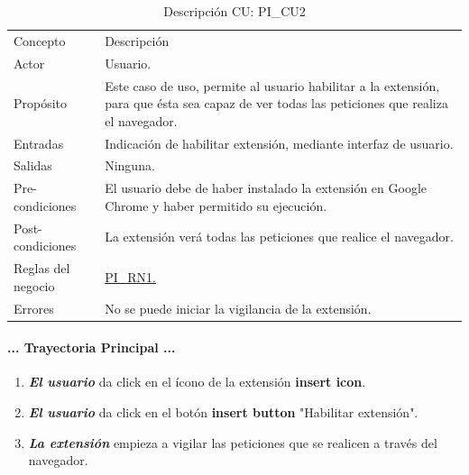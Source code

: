 \documentclass[12pt, a4paper, titlepage]{article}
\begin{document}
				\newpage
				\begin{table}[htb]
				\begin{center}
				\begin{tabular}{ |p{3.5cm}||p{9.5cm}|}
					\hline
					\rowcolor{guindapoli}
					\multicolumn{2}{|c|}{\textbf{\textcolor{white}{Caso de uso: PI\_CU2. Habilitar extensión.}}}\\
					\hline
					\rowcolor{azulfuerte}Concepto & Descripción\\
					\hline
					\cellcolor{azulclaro}Actor & 
					Usuario.\\ 
					\hline
					\cellcolor{azulclaro}Propósito &
					Este caso de uso, permite al usuario habilitar a la extensión, para que ésta sea capaz de ver todas las peticiones que realiza el navegador.\\
					\hline
					\cellcolor{azulclaro}Entradas &
					Indicación de habilitar extensión, mediante interfaz de usuario.\\
					\hline
					\cellcolor{azulclaro}Salidas &
					Ninguna.\\
					\hline
					\cellcolor{azulclaro}Pre-condiciones&
					El usuario debe de haber instalado la extensión en Google Chrome y haber permitido su ejecución.\\
					\hline
					\cellcolor{azulclaro}Post-condiciones&
					La extensión verá todas las peticiones que realice el navegador.\\
					\hline
					\cellcolor{azulclaro}Reglas del negocio&
					\hyperref[PI_RN1]{PI\_RN1.}\\
					\hline
					\cellcolor{azulclaro}Errores &
					No se puede iniciar la vigilancia de la extensión.\\
					
					\hline
				\end{tabular}
				\caption[DCU: PI\_CU2]{Descripción CU: PI\_CU2}
				\end{center}
				\end{table}
				
				\paragraph{... Trayectoria Principal ...}
				\begin{enumerate}
					\item \textbf{\textit{El usuario}} da click en el ícono de la extensión \textbf{insert icon}.
					\item \textbf{\textit{El usuario}} da click en el botón \textbf{insert button} "Habilitar extensión".
					\item \textbf{\textit{La extensión}} empieza a vigilar las peticiones que se realicen a través del navegador.
				\end{enumerate}
\end{document}
